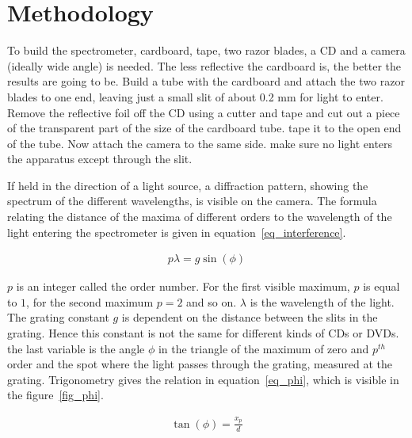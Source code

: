 \section{Methodology}

    To build the spectrometer, cardboard, tape, two razor blades, a CD and a camera (ideally wide angle) is needed.
    The less reflective the cardboard is, the better the results are going to be.
    Build a tube with the cardboard and attach the two razor blades to one end, leaving just a small slit of about 0.2 mm for light to enter.
    Remove the reflective foil off the CD using a cutter and tape and cut out a piece of the transparent part of the size of the cardboard tube.
    tape it to the open end of the tube.
    Now attach the camera to the same side.
    make sure no light enters the apparatus except through the slit.

    If held in the direction of a light source, a diffraction pattern, showing the spectrum of the different wavelengths, is visible on the camera.
    The formula relating the distance of the maxima of different orders to the wavelength of the light entering the spectrometer is given in equation~\eqref{eq_interference}.

    \begin{align}
        p \lambda = g \sin(\phi) \label{eq_interference}
    \end{align}

    $p$ is an integer called the order number. For the first visible maximum, $p$ is equal to $1$, for the second maximum $p = 2$ and so on.
    $\lambda$ is the wavelength of the light.
    The grating constant $g$ is dependent on the distance between the slits in the grating.
    Hence this constant is not the same for different kinds of CDs or DVDs.
    the last variable is the angle $\phi$ in the triangle of the maximum of zero and $p^{th}$ order and the spot where the light passes through the grating, measured at the grating.
    Trigonometry gives the relation in equation~\eqref{eq_phi}, which is visible in the figure~\ref{fig_phi}.
    
    \begin{align}
        \tan(\phi) = \frac{x_p}{d} \label{eq_phi}
    \end{align}


